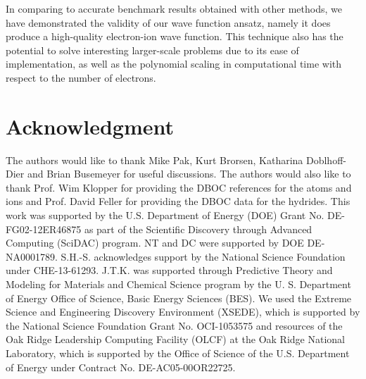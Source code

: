 \documentclass[aip,jcp,numerical,reprint]{revtex4-1}
\begin{document}
In comparing to accurate benchmark results obtained with other methods, we have demonstrated the validity of our wave function ansatz, namely it does produce a high-quality electron-ion wave function. This technique also has the potential to solve interesting larger-scale problems due to its ease of implementation, as well as the polynomial scaling in computational time with respect to the number of electrons.

\section{Acknowledgment}
The authors would like to thank Mike Pak, Kurt Brorsen, Katharina Doblhoff-Dier and Brian Busemeyer for useful discussions. The authors would also like to thank Prof. Wim Klopper for providing the DBOC references for the atoms and ions and Prof. David Feller for providing the DBOC data for the hydrides. This work was supported by the U.S. Department of Energy (DOE) Grant No. DE-FG02-12ER46875 as part of the Scientific Discovery through Advanced Computing (SciDAC) program. NT and DC were supported by DOE DE-NA0001789. S.H.-S. acknowledges support by the National Science Foundation under CHE-13-61293. J.T.K. was supported through Predictive Theory and Modeling for Materials and Chemical Science program by the U. S. Department of Energy Office of Science, Basic Energy Sciences (BES). We used the Extreme Science and Engineering Discovery Environment (XSEDE), which is supported by the National Science Foundation Grant No. OCI-1053575 and resources of the Oak Ridge Leadership Computing Facility (OLCF) at the Oak Ridge National Laboratory, which is supported by the Office of Science of the U.S. Department of Energy under Contract No. DE-AC05-00OR22725.


\end{document}

